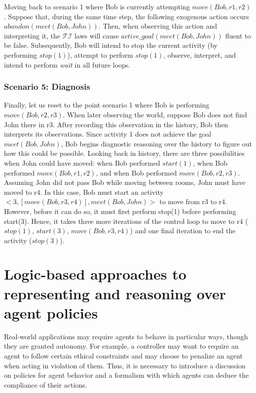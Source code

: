 Moving back to scenario 1 where Bob is currently attempting $move(Bob, r1, r2)$.
Suppose that, during the same time step, the following exogenous action occurs $abandon(meet(Bob, John))$.
Then, when observing this action and interpreting it, the $\mathcal{TI}$ laws will cause $active\_goal(meet(Bob, John))$ fluent to be false.
Subsequently, Bob will intend to stop the current activity (by performing $stop(1)$), attempt to perform $stop(1)$, observe, interpret, and intend to perform \textit{wait} in all future loops.

\subsubsection{Scenario 5: Diagnosis~\citep{blount_towards_2014}}
\label{subsubsec:aia_scenario_5}

Finally, let us reset to the point scenario 1 where Bob is performing $move(Bob, r2, r3)$.
When later observing the world, suppose Bob does not find John there in r3.
After recording this observation in the history, Bob then interprets its observations.
Since activity 1 does not achieve the goal $meet(Bob, John)$, Bob begins diagnostic reasoning over the history to figure out how this could be possible.
Looking back in history, there are three possibilities when John could have moved: when Bob performed $start(1)$, when Bob performed $move(Bob, r1, r2)$, and when Bob performed $move(Bob, r2, r3)$.
Assuming John did not pass Bob while moving between rooms, John must have moved to r4.
In this case, Bob must start an activity $<3, [move(Bob, r3, r4)],meet(Bob,John)>$ to move from r3 to r4.
However, before it can do so, it must first perform stop(1) before performing start(3).
Hence, it takes three more iterations of the control loop to move to r4 ($stop(1)$, $start(3)$, $move(Bob, r3,r4)$) and one final iteration to end the activity ($stop(3)$).

\section{Logic-based approaches to representing and reasoning over agent policies}
\label{sec:policies}

Real-world applications may require agents to behave in particular ways, though they are granted autonomy.
For example, a controller may want to require an agent to follow certain ethical constraints and may choose to penalize an agent when acting in violation of them.
Thus, it is necessary to introduce a discussion on policies for agent behavior and a formalism with which agents can deduce the compliance of their actions.

